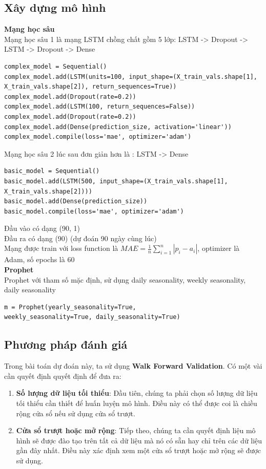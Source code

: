 \subsection{Xây dựng mô hình}
\textbf{Mạng học sâu} \\
Mạng học sâu 1 là mạng LSTM chồng chất gồm 5 lớp: LSTM -> Dropout -> LSTM -> Dropout -> Dense \\
\begin{verbatim}
complex_model = Sequential()
complex_model.add(LSTM(units=100, input_shape=(X_train_vals.shape[1],
X_train_vals.shape[2]), return_sequences=True))
complex_model.add(Dropout(rate=0.2))
complex_model.add(LSTM(100, return_sequences=False))
complex_model.add(Dropout(rate=0.2))
complex_model.add(Dense(prediction_size, activation='linear'))
complex_model.compile(loss='mae', optimizer='adam')
\end{verbatim}
Mạng học sâu 2 lúc sau đơn giản hơn là : LSTM -> Dense \\
\begin{verbatim}
basic_model = Sequential()
basic_model.add(LSTM(500, input_shape=(X_train_vals.shape[1],
X_train_vals.shape[2])))
basic_model.add(Dense(prediction_size))
basic_model.compile(loss='mae', optimizer='adam')
\end{verbatim}
Đầu vào có dạng (90, 1) \\
Đầu ra có dạng (90) (dự đoán 90 ngày cùng lúc) \\
Mạng được train với loss function là \(MAE = \frac{1}{n}\sum_{i=1}^{n}|p_i - a_i|\), optimizer là Adam, số epochs là 60 \\
\textbf{Prophet} \\
Prophet với tham số mặc định, sử dụng daily seasonality, weekly seasonality, daily seasonality \\
\begin{verbatim}
m = Prophet(yearly_seasonality=True, 
weekly_seasonality=True, daily_seasonality=True)
\end{verbatim}
\subsection{Phương pháp đánh giá}
Trong bài toán dự đoán này, ta sử dụng \textbf{Walk Forward Validation}.
Có một vài cần quyết định quyết định để đưa ra:
\begin{enumerate}
	\item \textbf{Số lượng dữ liệu tối thiểu}: Đầu tiên, chúng ta phải chọn số lượng dữ liệu tối thiểu cần thiết để huấn luyện mô hình. Điều này có thể được coi là chiều rộng cửa sổ nếu sử dụng cửa sổ trượt.
	\item \textbf{Cửa sổ trượt hoặc mở rộng}: Tiếp theo, chúng ta cần quyết định liệu mô hình sẽ được đào tạo trên tất cả dữ liệu mà nó có sẵn hay chỉ trên các dữ liệu gần đây nhất. Điều này xác định xem một cửa sổ trượt hoặc mở rộng sẽ được sử dụng.
\end{enumerate}

